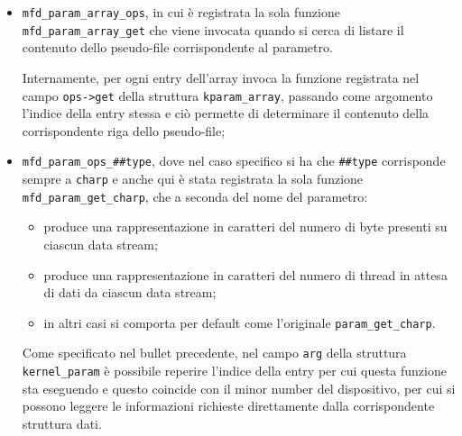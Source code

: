 \documentclass{article}
\begin{document}
\begin{itemize}
\item \texttt{mfd\_param\_array\_ops}, in cui è registrata la sola funzione \texttt{mfd\_param\_array\_get} che viene invocata quando si cerca di listare il contenuto dello pseudo-file corrispondente al parametro.

Internamente, per ogni entry dell'array invoca la funzione registrata nel campo \texttt{ops->get} della struttura \texttt{kparam\_array}, passando come argomento l'indice della entry stessa e ciò permette di determinare il contenuto della corrispondente riga dello pseudo-file;

\item \texttt{mfd\_param\_ops\_\#\#type}, dove nel caso specifico si ha che \texttt{\#\#type} corrisponde sempre a \texttt{charp} e anche qui è stata registrata la sola funzione \texttt{mfd\_param\_get\_charp}, che a seconda del nome del parametro:
\begin{itemize}
\item produce una rappresentazione in caratteri del numero di byte presenti su ciascun data stream;
\item produce una rappresentazione in caratteri del numero di thread in attesa di dati da ciascun data stream;
\item in altri casi si comporta per default come l'originale \texttt{param\_get\_charp}.
\end{itemize}
Come specificato nel bullet precedente, nel campo \texttt{arg} della struttura \texttt{kernel\_param} è possibile reperire l'indice della entry per cui questa funzione sta eseguendo e questo coincide con il minor number del dispositivo, per cui si possono leggere le informazioni richieste direttamente dalla corrispondente struttura dati.
\end{itemize}
\end{document}
